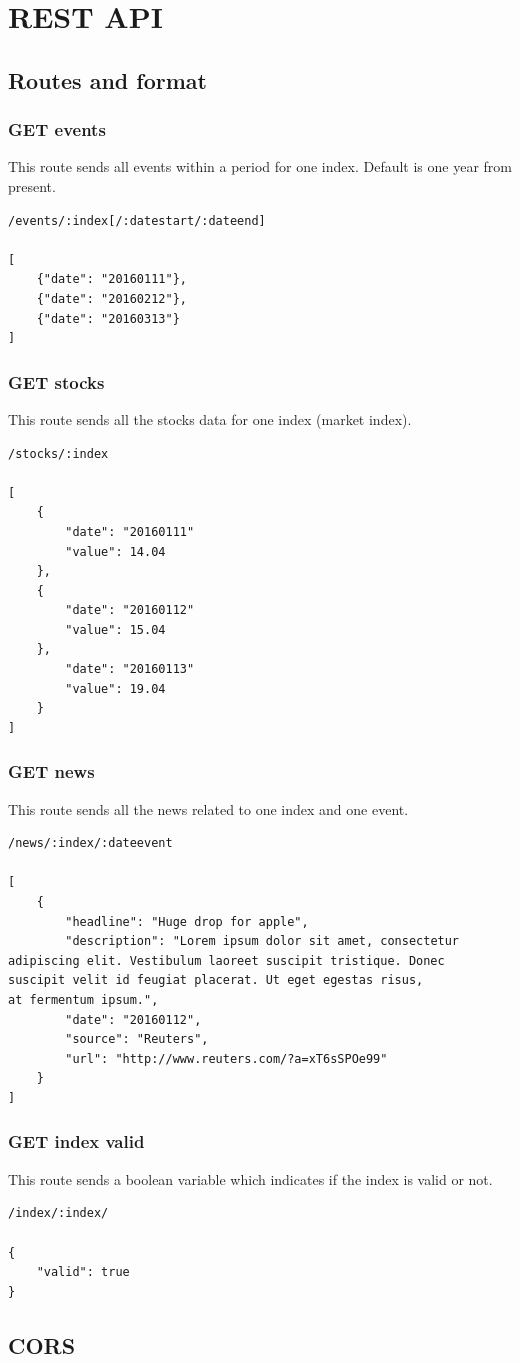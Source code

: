 \section{REST API}

\subsection{Routes and format}

\subsubsection*{GET events}
This route sends all events within a period for one index. Default is one year from present.
\begin{verbatim}
/events/:index[/:datestart/:dateend]

[
    {"date": "20160111"},
    {"date": "20160212"},
    {"date": "20160313"}
]
\end{verbatim}

\subsubsection*{GET stocks}
This route sends all the stocks data for one index (market index).
\begin{verbatim}
/stocks/:index

[
    {
        "date": "20160111"
        "value": 14.04
    },
    {
        "date": "20160112"
        "value": 15.04
    },
        "date": "20160113"
        "value": 19.04
    }
]
\end{verbatim}

\subsubsection*{GET news}
This route sends all the news related to one index and one event.
\begin{verbatim}
/news/:index/:dateevent

[
    {
        "headline": "Huge drop for apple",
        "description": "Lorem ipsum dolor sit amet, consectetur
adipiscing elit. Vestibulum laoreet suscipit tristique. Donec
suscipit velit id feugiat placerat. Ut eget egestas risus,
at fermentum ipsum.",
        "date": "20160112",
        "source": "Reuters",
        "url": "http://www.reuters.com/?a=xT6sSPOe99"
    }
]
\end{verbatim}

\subsubsection*{GET index valid}
This route sends a boolean variable which indicates if the index is valid or not.
\begin{verbatim}
/index/:index/

{
    "valid": true
}
\end{verbatim}
\subsection{CORS}
